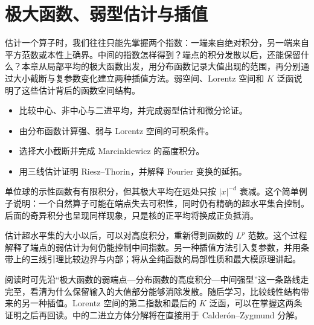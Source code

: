 \chapter{极大函数、弱型估计与插值}
\label{b2:ch:17}
\begin{chapterabstract}
估计一个算子时，我们往往只能先掌握两个指数：一端来自绝对积分，另一端来自平方范数或本性上确界。中间的指数怎样得到？端点的积分发散以后，还能保留什么？本章从局部平均的极大函数出发，用分布函数记录大值出现的范围，再分别通过大小截断与复参数变化建立两种插值方法。弱空间、Lorentz 空间和 \(K\) 泛函说明了这些估计背后的函数空间结构。
\end{chapterabstract}

\begin{learninggoals}\begin{itemize}
\item\label{b2:item:17-goal-1}比较中心、非中心与二进平均，并完成弱型估计和微分论证。
\item\label{b2:item:17-goal-2}由分布函数计算强、弱与 Lorentz 空间的可积条件。
\item\label{b2:item:17-goal-3}选择大小截断并完成 Marcinkiewicz 的高度积分。
\item\label{b2:item:17-goal-4}用三线估计证明 Riesz--Thorin，并解释 Fourier 变换的延拓。
\end{itemize}\end{learninggoals}

单位球的示性函数有有限积分，但其极大平均在远处只按 \(|x|^{-d}\) 衰减。这个简单例子说明：一个自然算子可能在端点失去可积性，同时仍有精确的超水平集合控制。后面的奇异积分也呈现同样现象，只是核的正平均将换成正负抵消。

\ProseParagraphBreak

估计超水平集的大小以后，可以对高度积分，重新得到函数的 \(L^p\) 范数。这个过程解释了端点的弱估计为何仍能控制中间指数。另一种插值方法引入复参数，并用条带上的三线引理比较边界与内部；将从全纯函数的局部性质和最大模原理讲起。

\ProseParagraphBreak

阅读时可先沿“极大函数的弱端点---分布函数的高度积分---中间强型”这一条路线走完至，看清为什么保留输入的大值部分能够消除发散。随后学习，比较线性结构带来的另一种插值。Lorentz 空间的第二指数和最后的 \(K\) 泛函，可以在掌握这两条证明之后再回读。中的二进立方体分解将在直接用于 Calderón--Zygmund 分解。

